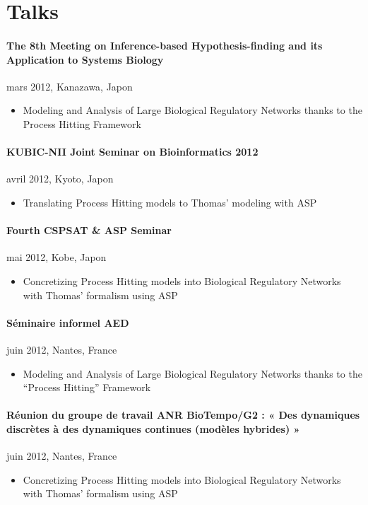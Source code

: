 \section{Talks}

\paragraph{The 8th Meeting on Inference-based Hypothesis-finding and its Application to Systems Biology}
mars 2012, Kanazawa, Japon
\begin{itemize}
\item[] Modeling and Analysis of Large Biological Regulatory Networks thanks to the Process Hitting Framework
\end{itemize}

\paragraph{KUBIC-NII Joint Seminar on Bioinformatics 2012}
avril 2012, Kyoto, Japon
\begin{itemize}
\item[] Translating Process Hitting models to Thomas' modeling with ASP
\end{itemize}

\paragraph{Fourth CSPSAT \& ASP Seminar}
mai 2012, Kobe, Japon
\begin{itemize}
\item[] Concretizing Process Hitting models into Biological Regulatory Networks with Thomas' formalism using ASP
\end{itemize}

\paragraph{Séminaire informel AED}
juin 2012, Nantes, France
\begin{itemize}
\item[] Modeling and Analysis of Large Biological Regulatory Networks thanks to the “Process Hitting” Framework
\end{itemize}

\paragraph{Réunion du groupe de travail ANR BioTempo/G2 : « Des dynamiques discrètes à des dynamiques continues (modèles hybrides) »}
juin 2012, Nantes, France
\begin{itemize}
\item[] Concretizing Process Hitting models into Biological Regulatory Networks with Thomas' formalism using ASP
\end{itemize}
